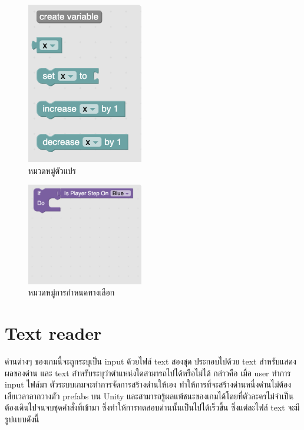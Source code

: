 \begin{figure}[H]
    \begin{center}
    \includegraphics[width=2in]{pic-toro/block_category/variableCat.png}
    \end{center}
    \caption[หมวดหมู่ตัวแปร]{หมวดหมู่ตัวแปร}
    \label{variableCat}
\end{figure}
\begin{figure}[H]
    \begin{center}
    \includegraphics[width=2in]{pic-toro/block_category/statementCat.png}
    \end{center}
    \caption[หมวดหมู่การกำหนดทางเลือก]{หมวดหมู่การกำหนดทางเลือก}
    \label{statementCat}
\end{figure}
\clearpage

\section{Text reader}
ด่านต่างๆ ของเกมนี้จะถูกระบุเป็น input ด้วยไฟล์ text สองชุด ประกอบไปด้วย text สำหรับแสดงผลของด่าน และ text สำหรับระบุว่าตำแหน่งใดสามารถไปได้หรือไม่ได้ กล่าวคือ เมื่อ user ทำการ input ไฟล์มา ตัวระบบเกมจะทำการจัดการสร้างด่านให้เอง
ทำให้การที่จะสร้างด่านหนึ่งด่านไม่ต้องเสียเวลาลากวางตัว prefabs บน Unity และสามารถรู้ผลแพ้ชนะของเกมได้โดยที่ตัวละครไม่จำเป็นต้องเดินไปจนจบชุดคำสั่งที่เข้ามา ซึ่งทำให้การทดสอบด่านนั้นเป็นไปได้เร็วขึ้น
ซึ่งแต่ละไฟล์ text จะมีรูปแบบดังนี้

